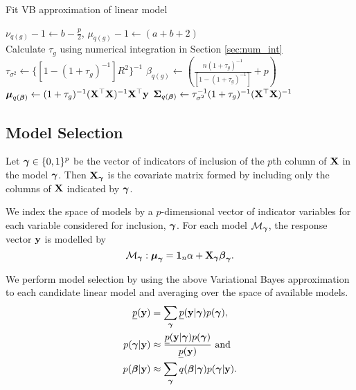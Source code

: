 \documentclass{amsart}[12pt]
\begin{document}
\begin{algorithm}
	\caption{Fit VB approximation of linear model}
	\label{alg:algorithm_two}
	\begin{algorithmic}
		\REQUIRE $\nu_{q(g)} - 1 \leftarrow b - \frac{p}{2}$, $\mu_{q(g)} - 1 \leftarrow (a + b + 2)$ \\
		\STATE Calculate $\tau_{g}$ using numerical integration in Section \ref{sec:num_int}
		\ENDWHILE
		\STATE $\tau_{\sigma^2} \leftarrow \{[1 - (1 + \tau_g)^{-1}] R^2\}^{-1}$
		\STATE $\beta_{q(g)} \leftarrow \left(\frac{n (1 + \tau_g)^{-1}}{[1 - (1 + \tau_g)^{-1}]} + p \right)$
		\STATE ${\boldsymbol \mu}_{q({\boldsymbol \beta})} \leftarrow (1 + \tau_g)^{-1} ({\bf X}^\top {\bf X})^{-1} {\bf X}^\top {\bf y}$
		\STATE ${\boldsymbol \Sigma}_{q({\boldsymbol \beta})} \leftarrow \tau_{\sigma^2}^{-1} (1 + \tau_{g})^{-1}({\bf X}^\top {\bf X})^{-1}$
	\end{algorithmic}
\end{algorithm}

\subsection{Model Selection}
\label{sec:model_selection}

Let ${\boldsymbol \gamma} \in \{0, 1\}^p$ be the vector of indicators of inclusion of the $p$th column of ${\bf X}$ in the
model ${\boldsymbol \gamma}$. Then ${\bf X}_{\boldsymbol \gamma}$ is the covariate matrix formed by including only the columns of ${\bf X}$
indicated by ${\boldsymbol \gamma}$.

We index the space of models by a $p$-dimensional vector of indicator variables for each variable considered 
for inclusion, ${\boldsymbol \gamma}$. For each model $\mathcal{M}_{\boldsymbol \gamma}$, the response vector ${\bf y}$ is modelled by
\begin{equation*}
	\mathcal{M}_{\boldsymbol \gamma}: {\boldsymbol \mu}_{\boldsymbol \gamma} = {\bf 1}_n \alpha + {\bf X}_{\boldsymbol \gamma} {\boldsymbol \beta}_{\boldsymbol \gamma}.
\end{equation*}

We perform model selection by using the above Variational Bayes approximation to each
candidate linear model and averaging over the space of available models.
\begin{align*}
	\underline{p}({\bf y}) & = \sum_{\boldsymbol \gamma} \underline{p}({\bf y}|{\boldsymbol \gamma}) p({\boldsymbol \gamma}),                                  \\
	p({\boldsymbol \gamma}|{\bf y})     & \approx \frac{\underline{p}({\bf y}|{\boldsymbol \gamma}) p({\boldsymbol \gamma})}{\underline{p}({\bf y})} \text { and } \\
	p({\boldsymbol \beta}|{\bf y})      & \approx \sum_{\boldsymbol \gamma} q({\boldsymbol \beta}|{\boldsymbol \gamma}) p({\boldsymbol \gamma}|{\bf y}).                                 \\
\end{align*}
\end{document}
